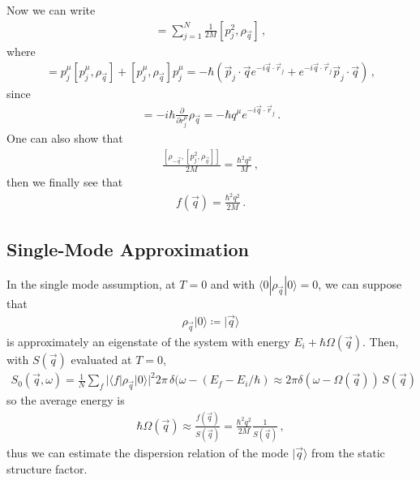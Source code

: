 \documentclass[11pt, oneside]{book}
\theoremstyle{break}
\theoremstyle{break}
\newcommand{\pd}{\partial}
\begin{document}
Now we can write
\begin{align*}
[T, \rho_{\vec{q}}] = \sum_{j=1}^N \frac{1}{2M}[p_j^2, \rho_{\vec{q}}]\,,
\end{align*}
where 
\begin{align*}
[p_j^2, \rho_{\vec{q}}] = p_j^\mu [p_j^\mu, \rho_{\vec{q}}] + [p_j^\mu , \rho_{\vec{q}}] p_j^\mu =-\hbar
( \vec{p}_j \cdot \vec{q}e^{-i\vec{q}\cdot \vec{r}_j} + e^{-i\vec{q}\cdot \vec{r}_j}\vec{p}_j \cdot \vec{q})
\,,
\end{align*}
since
\begin{align*}
[p_j^\mu, \rho_{\vec{q}}] = -i\hbar \frac{\pd}{\pd r_j^\mu}\rho_{\vec{q}} = -\hbar q^{\mu} e^{-i \vec{q}\cdot \vec{r}_j}\,.
\end{align*}
One can also show that 
\begin{align*}
\frac{[\rho_{-\vec{q}}, [p_j^2, \rho_{\vec{q}}]]}{2M} = \frac{\hbar^2 q^2}{M}\,,
\end{align*}
then we finally see that 
\begin{align*}
f(\vec{q}) = \frac{\hbar^2 q^2}{2M}\,.
\end{align*}

\subsection{Single-Mode Approximation}
In the single mode assumption, at $T=0$ and with $\langle0|\rho_{\vec{q}}|0\rangle=0$, we can suppose that 
\begin{align*}
\rho_{\vec{q}}|0\rangle \coloneqq | \vec{q}\rangle
\end{align*}
is approximately an eigenstate of the system with energy $E_i+\hbar \Omega(\vec{q})$. Then, with $S(\vec{q})$ evaluated at $T=0$, 
\begin{align*}
S_0(\vec{q},\omega) = \frac{1}{N} \sum_f |\langle f | \rho_{\vec{q}}|0\rangle|^2 2\pi \, \delta(\omega - (E_f - E_i/\hbar) \approx 2\pi\delta(\omega - \Omega(\vec{q})) \, S(\vec{q})
\end{align*} 
so the average energy is 
\begin{align*}
\hbar \Omega(\vec{q}) \approx \frac{f(\vec{q})}{S(\vec{q})} = \frac{\hbar^2 q^2}{2M} \frac{1}{S(\vec{q})}\,,
\end{align*}
thus we can estimate the dispersion relation of the mode $|\vec{q}\rangle$ from the static structure factor. \newpage
\end{document}
